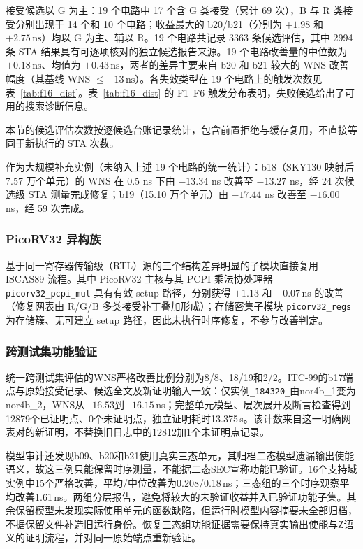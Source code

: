 \documentclass[twocolumn,10pt,fontset=windows]{ctexart}
\begin{document}
接受候选以 G 为主：19 个电路中 17 个含 G 类接受（累计 69 次），B 与 R 类接受分别出现于 14 个和 10 个电路；收益最大的 b20/b21（分别为 $+1.98$ 和 $+2.75\,\text{ns}$）均以 G 为主、辅以 R。19 个电路共记录 3363 条候选评估，其中 2994 条 STA 结果具有可逐项核对的独立候选报告来源。19 个电路改善量的中位数为 $+0.18\,\text{ns}$、均值为 $+0.43\,\text{ns}$，两者的差异主要来自 b20 和 b21 较大的 WNS 改善幅度（其基线 WNS $\le -13\,\text{ns}$）。各失效类型在 19 个电路上的触发次数见表~\ref{tab:f16_dist}。表~\ref{tab:f16_dist} 的 F1--F6 触发分布表明，失败候选给出了可用的搜索诊断信息。

本节的候选评估次数按逐候选台账记录统计，包含前置拒绝与缓存复用，不直接等同于新执行的 STA 次数。

作为大规模补充实例（未纳入上述 19 个电路的统一统计）：b18（SKY130 映射后 7.57 万个单元）的 WNS 在 0.5 ns 下由 $-13.34$ ns 改善至 $-13.27$ ns，经 24 次候选级 STA 测量完成修复；b19（15.10 万个单元）由 $-17.44$ ns 改善至 $-16.00$ ns，经 59 次完成。

\subsubsection{PicoRV32 异构族}

基于同一寄存器传输级（RTL）源的三个结构差异明显的子模块直接复用 ISCAS89 流程。其中 PicoRV32 主核与其 PCPI 乘法协处理器 \texttt{picorv32\_pcpi\_mul} 具有有效 setup 路径，分别获得 $+1.13$ 和 $+0.07\,$ns 的改善（修复网表由 R/G/B 多类接受补丁叠加形成）；存储密集子模块 \texttt{picorv32\_regs} 为存储簇、无可建立 setup 路径，因此未执行时序修复，不参与改善判定。

\subsubsection{跨测试集功能验证}\label{sec:crossset_validation}

统一跨测试集评估的WNS严格改善比例分别为8/8、18/19和2/2。ITC-99的b17端点与原始接受记录、候选全文及新证明输入一致：仅实例\texttt{\_184320\_}由nor4b\_1变为nor4b\_2，WNS从$-16.53$到$-16.15$\,ns；完整单元模型、层次展开及断言检查得到12879个已证明点、0个未证明点，独立证明耗时13.375\,s。该计数来自这一明确网表对的新证明，不替换旧日志中的12812加1个未证明点记录。

模型审计还发现b09、b20和b21使用真实三态单元，其归档二态模型遗漏输出使能语义，故这三例只能保留时序测量，不能据二态SEC宣称功能已验证。16个支持域实例中15个严格改善，平均/中位改善为0.208/0.18\,ns；三态组的三个时序观察平均改善1.61\,ns。两组分层报告，避免将较大的未验证收益并入已验证功能子集。其余保留模型未发现实际使用单元的函数缺陷，但运行时模型内容摘要未全部归档，不据保留文件补造旧运行身份。恢复三态组功能证据需要保持真实输出使能与Z语义的证明流程，并对同一原始端点重新验证。
\end{document}
